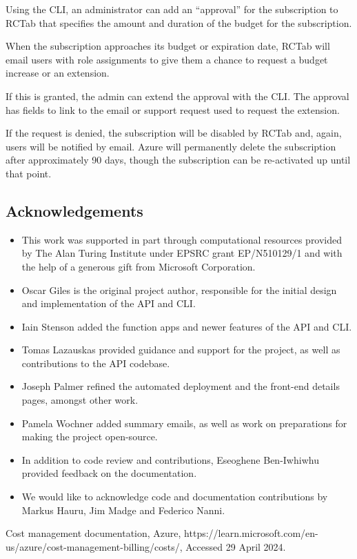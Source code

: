 \documentclass[
]{article}
\providecommand{\tightlist}{%
  \setlength{\itemsep}{0pt}\setlength{\parskip}{0pt}}
\begin{document}
Using the CLI, an administrator can add an ``approval'' for the
subscription to RCTab that specifies the amount and duration of the
budget for the subscription.

When the subscription approaches its budget or expiration date, RCTab
will email users with role assignments to give them a chance to request
a budget increase or an extension.

If this is granted, the admin can extend the approval with the CLI. The
approval has fields to link to the email or support request used to
request the extension.

If the request is denied, the subscription will be disabled by RCTab
and, again, users will be notified by email. Azure will permanently
delete the subscription after approximately 90 days, though the
subscription can be re-activated up until that point.

\subsection{Acknowledgements}\label{acknowledgements}

\begin{itemize}
\tightlist
\item
  This work was supported in part through computational resources
  provided by The Alan Turing Institute under EPSRC grant EP/N510129/1
  and with the help of a generous gift from Microsoft Corporation.
\item
  Oscar Giles is the original project author, responsible for the
  initial design and implementation of the API and CLI.
\item
  Iain Stenson added the function apps and newer features of the API and
  CLI.
\item
  Tomas Lazauskas provided guidance and support for the project, as well
  as contributions to the API codebase.
\item
  Joseph Palmer refined the automated deployment and the front-end
  details pages, amongst other work.
\item
  Pamela Wochner added summary emails, as well as work on preparations
  for making the project open-source.
\item
  In addition to code review and contributions, Eseoghene Ben-Iwhiwhu
  provided feedback on the documentation.
\item
  We would like to acknowledge code and documentation contributions by
  Markus Hauru, Jim Madge and Federico Nanni.
\end{itemize}
\begin{thebibliography}{9}

    Cost management documentation,
    Azure,
    https://learn.microsoft.com/en-us/azure/cost-management-billing/costs/,
    Accessed 29 April 2024. 

\end{thebibliography}
\end{document}
